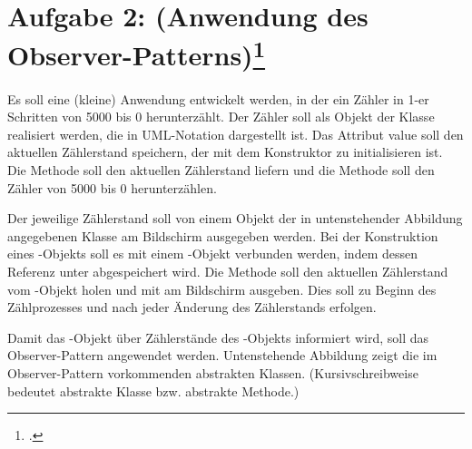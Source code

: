 \documentclass{lehramt-informatik-minimal}
\begin{document}
\section{Aufgabe 2: (Anwendung des Observer-Patterns)\footcite{examen:66116:2018:03}}

Es soll eine (kleine) Anwendung entwickelt werden, in der ein Zähler in
1-er Schritten von 5000 bis 0 herunterzählt. Der Zähler soll als Objekt
der Klasse  realisiert werden, die in UML-Notation
dargestellt ist. Das Attribut value soll den aktuellen Zählerstand
speichern, der mit dem Konstruktor zu initialisieren ist. Die Methode
 soll den aktuellen Zählerstand liefern und die Methode
 soll den Zähler von 5000 bis 0 herunterzählen.

Der jeweilige Zählerstand soll von einem Objekt der in untenstehender
Abbildung angegebenen Klasse  am Bildschirm ausgegeben
werden. Bei der Konstruktion eines -Objekts soll es mit
einem -Objekt verbunden werden, indem dessen Referenz
unter  abgespeichert wird. Die Methode 
soll den aktuellen Zählerstand vom -Objekt holen und mit
 am Bildschirm ausgeben. Dies soll zu Beginn
des Zählprozesses und nach jeder Änderung des Zählerstands erfolgen.

\begin{center}
\end{center}

\noindent
Damit das -Objekt über Zählerstände des
-Objekts informiert wird, soll das Observer-Pattern
angewendet werden. Untenstehende Abbildung zeigt die im Observer-Pattern
vorkommenden abstrakten Klassen. (Kursivschreibweise bedeutet abstrakte
Klasse bzw. abstrakte Methode.)

\begin{center}
\end{center}
\end{document}
